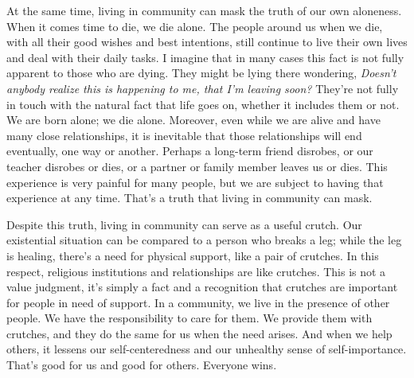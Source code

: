 At the same time, living in community can mask the truth of our own 
aloneness. When it comes time to die, we die alone. The people around 
us when we die, with all their good wishes and best intentions, still 
continue to live their own lives and deal with their daily tasks. I 
imagine that in many cases this fact is not fully apparent to those who 
are dying. They might be lying there wondering, \emph{Doesn't anybody 
realize this is happening to me, that I'm leaving soon?} They're not 
fully in touch with the natural fact that life goes on, whether it 
includes them or not. We are born alone; we die alone. Moreover, even 
while we are alive and have many close relationships, it is inevitable 
that those relationships will end eventually, one way or another. 
Perhaps a long-term friend disrobes, or our teacher disrobes or dies, 
or a partner or family member leaves us or dies. This experience is 
very painful for many people, but we are subject to having that 
experience at any time. That's a truth that living in community can 
mask.

Despite this truth, living in community can serve as a useful crutch. 
Our existential situation can be compared to a person who breaks a leg; 
while the leg is healing, there's a need for physical support, like a 
pair of crutches. In this respect, religious institutions and 
relationships are like crutches. This is not a value judgment, it's 
simply a fact and a recognition that crutches are important for people 
in need of support. In a community, we live in the presence of other 
people. We have the responsibility to care for them. We provide them 
with crutches, and they do the same for us when the need arises. And 
when we help others, it lessens our self-centeredness and our unhealthy 
sense of self-importance. That's good for us and good for others. 
Everyone wins.

